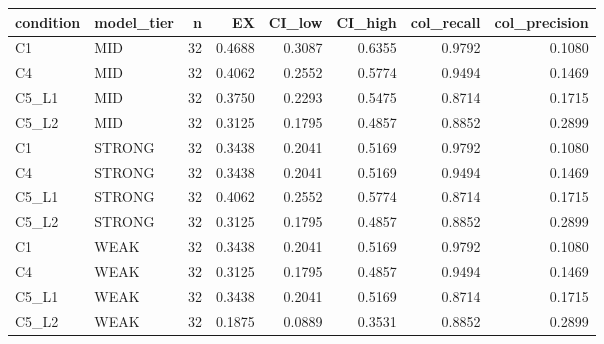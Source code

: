 \begin{tabular}{llrrrrrr}
\toprule
condition & model\_tier & n & EX & CI\_low & CI\_high & col\_recall & col\_precision \\
\midrule
C1 & MID & 32 & 0.4688 & 0.3087 & 0.6355 & 0.9792 & 0.1080 \\
C4 & MID & 32 & 0.4062 & 0.2552 & 0.5774 & 0.9494 & 0.1469 \\
C5\_L1 & MID & 32 & 0.3750 & 0.2293 & 0.5475 & 0.8714 & 0.1715 \\
C5\_L2 & MID & 32 & 0.3125 & 0.1795 & 0.4857 & 0.8852 & 0.2899 \\
C1 & STRONG & 32 & 0.3438 & 0.2041 & 0.5169 & 0.9792 & 0.1080 \\
C4 & STRONG & 32 & 0.3438 & 0.2041 & 0.5169 & 0.9494 & 0.1469 \\
C5\_L1 & STRONG & 32 & 0.4062 & 0.2552 & 0.5774 & 0.8714 & 0.1715 \\
C5\_L2 & STRONG & 32 & 0.3125 & 0.1795 & 0.4857 & 0.8852 & 0.2899 \\
C1 & WEAK & 32 & 0.3438 & 0.2041 & 0.5169 & 0.9792 & 0.1080 \\
C4 & WEAK & 32 & 0.3125 & 0.1795 & 0.4857 & 0.9494 & 0.1469 \\
C5\_L1 & WEAK & 32 & 0.3438 & 0.2041 & 0.5169 & 0.8714 & 0.1715 \\
C5\_L2 & WEAK & 32 & 0.1875 & 0.0889 & 0.3531 & 0.8852 & 0.2899 \\
\bottomrule
\end{tabular}
